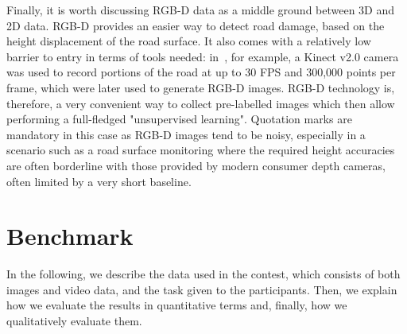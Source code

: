 \documentclass[twocolumn]{article}
\begin{document}
Finally, it is worth discussing RGB-D data as a middle ground between 3D and 2D data. RGB-D provides an easier way to detect road damage, based on the height displacement of the road surface. It also comes with a relatively low barrier to entry in terms of tools needed: in~\cite{Ouma20}, for example, a Kinect v2.0 camera was used to record portions of the road at up to 30 FPS and 300,000 points per frame, which were later used to generate RGB-D images.
RGB-D technology is, therefore, a very convenient way to collect pre-labelled images which then allow performing a full-fledged "unsupervised learning". Quotation marks are mandatory in this case as RGB-D images tend to be noisy, especially in a scenario such as a road surface monitoring where the required height accuracies are often borderline with those provided by modern consumer depth cameras, often limited by a very short baseline.



\section{Benchmark}
\label{sec:contest_setup}
In the following, we describe the data used in the contest, which consists of both images and video data, and the task given to the participants. Then, we explain how we evaluate the results in quantitative terms and, finally, how we qualitatively evaluate them.
\end{document}
